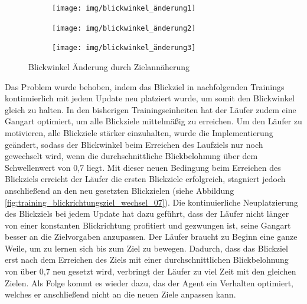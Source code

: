 \begin{figure}[H]
  \centering  
    \begin{subfigure}{.3\textwidth}
      \centering  
      \texttt{[image: img/blickwinkel\_änderung1]}
    \end{subfigure}
    \begin{subfigure}{.3\textwidth}
      \centering  
      \texttt{[image: img/blickwinkel\_änderung2]}
    \end{subfigure}
    \begin{subfigure}{.3\textwidth}
      \centering  
      \texttt{[image: img/blickwinkel\_änderung3]}
    \end{subfigure}
  \caption{Blickwinkel Änderung durch Zielannäherung}
  \label{fig:blickwinkel_änderung}
\end{figure}

Das Problem wurde behoben, indem das Blickziel in nachfolgenden Trainings kontinuierlich mit jedem Update neu platziert wurde, um somit den Blickwinkel gleich zu halten. In den bisherigen Trainingseinheiten hat der Läufer zudem eine Gangart optimiert, um alle Blickziele mittelmäßig zu erreichen. Um den Läufer zu motivieren, alle Blickziele stärker einzuhalten, wurde die Implementierung geändert, sodass der Blickwinkel beim Erreichen des Laufziels nur noch gewechselt wird, wenn die durchschnittliche Blickbelohnung über dem Schwellenwert von 0,7 liegt. Mit dieser neuen Bedingung beim Erreichen des Blickziels erreicht der Läufer die ersten Blickziele erfolgreich, stagniert jedoch anschließend an den neu gesetzten Blickzielen (siehe Abbildung \ref{fig:training_blickrichtungsziel_wechsel_07}). Die kontinuierliche Neuplatzierung des Blickziels bei jedem Update hat dazu geführt, dass der Läufer nicht länger von einer konstanten Blickrichtung profitiert und gezwungen ist, seine Gangart besser an die Zielvorgaben anzupassen. Der Läufer braucht zu Beginn eine ganze Weile, um zu lernen sich bis zum Ziel zu bewegen. Dadurch, dass das Blickziel erst nach dem Erreichen des Ziels mit einer durchschnittlichen Blickbelohnung von über 0,7 neu gesetzt wird, verbringt der Läufer zu viel Zeit mit den gleichen Zielen. Als Folge kommt es wieder dazu, das der Agent ein Verhalten optimiert, welches er anschließend nicht an die neuen Ziele anpassen kann.

